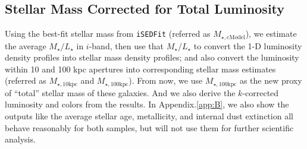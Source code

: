 \documentclass{emulateapj}
\def\minn{{$M_{\star,10\mathrm{kpc}}$}}
\def\mtot{{$M_{\star,100\mathrm{kpc}}$}}
\def\mcmodel{{$M_{\star,\mathrm{cModel}}$}}
\def\m2l{{$M_{\star}/L_{\star}$}}
\begin{document}
\begin{CJK*}{UTF8}{gbsn}
\subsection{Stellar Mass Corrected for Total Luminosity}
    \label{ssec:mtotal}
    
    Using the best-fit stellar mass from \texttt{iSEDFit} (referred as \mcmodel{}), 
    we estimate the average \m2l{} in $i$-band, then use that \m2l{} to convert the 
    1-D luminosity density profiles into stellar mass density profiles; and 
    also convert the luminosity within 10 and 100 kpc apertures into 
    corresponding stellar mass estimates (referred as \minn{} and \mtot{}). 
    From now, we use \mtot{} as the new proxy of ``total'' stellar mass of these 
    galaxies.  
    And we also derive the $k$-corrected luminosity and colors from the results.
    In Appendix.\ref{app:B}, we also show the outputs like the average stellar age, 
    metallicity, and internal dust extinction all behave reasonably for both 
    samples, but will not use them for further scientific analysis. 
    

\end{CJK*}
\end{document}
